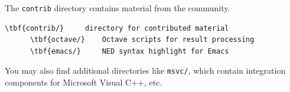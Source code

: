 The \texttt{contrib} directory contains material from the {\opp} community.

\begin{Verbatim}[commandchars=\\\{\}]
    \tbf{contrib/}     directory for contributed material
      \tbf{octave/}    Octave scripts for result processing
      \tbf{emacs/}     NED syntax highlight for Emacs
\end{Verbatim}

You may also find additional directories like \texttt{msvc/}, which contain
integration components for Microsoft Visual C++, etc.


